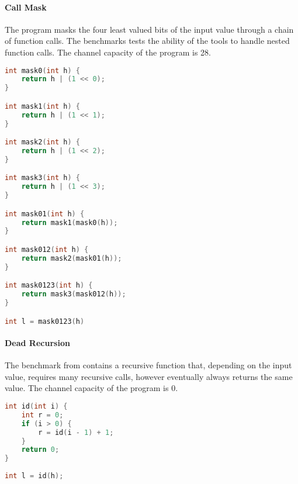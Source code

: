 \paragraph{Call Mask} The program masks the four least valued bits of the input value through a chain of function calls. The benchmarks tests the ability of the tools to handle nested function calls. The channel capacity of the program is 28.

\begin{center}
    \begin{lstlisting}[language=C, caption=Call Mask, captionpos=b]
int mask0(int h) {
    return h | (1 << 0);
}

int mask1(int h) {
    return h | (1 << 1);
}

int mask2(int h) {
    return h | (1 << 2);
}

int mask3(int h) {
    return h | (1 << 3);
}

int mask01(int h) {
    return mask1(mask0(h));
}

int mask012(int h) {
    return mask2(mask01(h));
}

int mask0123(int h) {
    return mask3(mask012(h));
}

int l = mask0123(h)
    \end{lstlisting}
\end{center}

\paragraph{Dead Recursion} The benchmark from \cite{bechberger18} contains a recursive function that, depending on the input value, requires many recursive calls, however eventually always returns the same value. The channel capacity of the program is 0.

\begin{center}
    \begin{lstlisting}[language=C, caption=Dead Recursion, captionpos=b]
int id(int i) {
    int r = 0;
    if (i > 0) {
        r = id(i - 1) + 1;
    }
    return 0;
}
    
int l = id(h);
    \end{lstlisting}
\end{center}